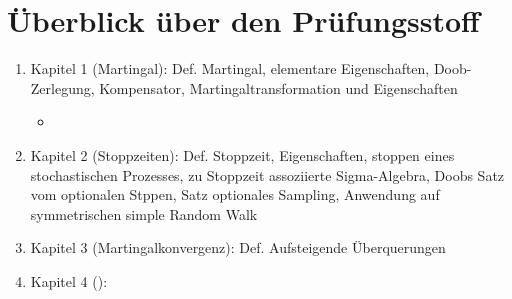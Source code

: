 
\chapter{Überblick über den Prüfungsstoff}

\begin{enumerate}
	\item Kapitel 1 (Martingal):
	Def. Martingal, elementare Eigenschaften, Doob-Zerlegung, Kompensator, Martingaltransformation und Eigenschaften
	\begin{itemize}
		\item 
	\end{itemize}
	\item Kapitel 2 (Stoppzeiten):
	Def. Stoppzeit, Eigenschaften, stoppen eines stochastischen Prozesses, zu Stoppzeit assoziierte Sigma-Algebra, Doobs Satz vom optionalen Stppen, Satz optionales Sampling, Anwendung auf symmetrischen simple Random Walk
	\item Kapitel 3 (Martingalkonvergenz):
	Def. Aufsteigende Überquerungen
	\item Kapitel 4 ():
\end{enumerate}
